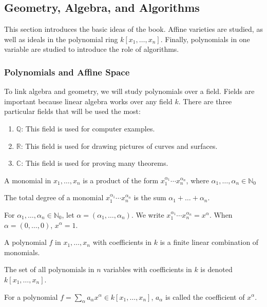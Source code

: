 \documentclass[../main.tex]{subfiles}
\begin{document}
\subsection{Geometry, Algebra, and Algorithms}
%
This section introduces the basic ideas of the book. Affine varieties are studied, as well as ideals in the polynomial ring $k[x_1,\hdots ,x_n]$. Finally, polynomials in one variable are studied to introduce the role of algorithms.

\subsubsection{Polynomials and Affine Space}
%
To link algebra and geometry, we will study polynomials over a field. Fields are important because linear algebra works over any field $k$. There are three particular fields that will be used the most:
%
\begin{enumerate}
\item $\mathbb{Q}$: This field is used for computer examples.
\item $\mathbb{R}$: This field is used for drawing pictures of curves and surfaces.
\item $\mathbb{C}$: This field is used for proving many theorems.
\end{enumerate}
%
\begin{definition}
A monomial in $x_1,\hdots, x_n$ is a product of the form $x_1^{\alpha_1} \cdots x_n^{\alpha_n}$, where $\alpha_1,\hdots, \alpha_n \in \mathbb{N}_0$
\end{definition}
%
\begin{definition}
The total degree of a monomial $x_1^{\alpha_1}\cdots x_n^{\alpha_n}$ is the sum $\alpha_1+\hdots + \alpha_n$.
\end{definition}
%
\begin{notation}
For $\alpha_1,\hdots, \alpha_n\in \mathbb{N}_0$, let $\alpha = (\alpha_1,\hdots ,\alpha_n)$. We write $x_1^{\alpha_1} \cdots x_n^{\alpha_n}=x^\alpha$. When $\alpha = (0,\hdots, 0)$, $x^\alpha = 1$.
\end{notation}
%
\begin{definition}
A polynomial $f$ in $x_1,\hdots, x_n$ with coefficients in $k$ is a finite linear combination of monomials.
\end{definition}
%
\begin{notation}
The set of all polynomials in $n$ variables with coefficients in $k$ is denoted $k[x_1,\hdots ,x_n]$.
\end{notation}
%
\begin{definition}
For a polynomial $f = \sum_{\alpha} a_\alpha x^\alpha \in k[x_1,\hdots ,x_n]$, $a_\alpha$ is called the coefficient of $x^\alpha$.
\end{definition}
\end{document}
